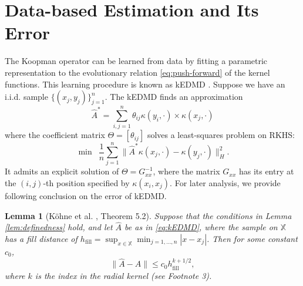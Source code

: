\documentclass[english]{cccconf}
\newtheorem{lemma}{Lemma}
\newcommand{\mr}[1]{\mathrm{#1}}
\newcommand{\mbb}[1]{\mathds{#1}} %
\newcommand{\mX}{\mbb{X}}
\newcommand{\bra}[1]{\left( #1 \right)}
\begin{document}
\section{Data-based Estimation and Its Error}\label{sec:estimation}
\par The Koopman operator can be learned from data by fitting a parametric representation to the evolutionary relation \eqref{eq:push-forward} of the kernel functions. This learning procedure is known as kEDMD \citep{william2015kernel}. 
Suppose we have an i.i.d. sample $\{(x_j, y_j)\}_{j=1}^n$. The kEDMD finds an approximation 
\begin{equation}\label{eq:A.approximation}
\textstyle
    \hat{A}^\ast = \sum_{i,j=1}^n \theta_{ij}\kappa(y_i, \cdot)\times \kappa(x_j, \cdot)    
\end{equation}
where the coefficient matrix $\Theta = [\theta_{ij}]$ solves a least-squares problem on RKHS:
\begin{equation}\label{eq:kEDMD}
\textstyle
    \min \enspace \frac{1}{n}\sum_{j=1}^n \|\hat{A}^\ast \kappa\bra{x_j, \cdot} - \kappa\bra{y_j, \cdot}\|_H^2.   
\end{equation}
It admits an explicit solution of $\Theta = G_{xx}^{-1}$, where the matrix $G_{xx}$ has its entry at the $(i,j)$-th position specified by $\kappa(x_i,x_j)$. 
For later analysis, we provide following conclusion on the error of kEDMD. 
\begin{lemma}[K{\"{o}}hne et al. \cite{kohne2025Linf}, Theorem 5.2]
\label{lem:kEDMD}
    Suppose that the conditions in Lemma \ref{lem:definedness} hold, and let $\hat{A}$ be as in \eqref{eq:kEDMD}, where the sample on $\mX$ has a fill distance of $h_\mr{fill} = \sup_{x\in \mX}\min_{j=1,\dots,n} |x-x_j|$. Then for some constant $c_0$,
    \begin{displaymath}
        \|\hat{A}-A\| \leq c_0h_{\mr{fill}}^{k+1/2}, 
    \end{displaymath} 
    where $k$ is the index in the radial kernel (see Footnote 3). 
\end{lemma}
\end{document}
